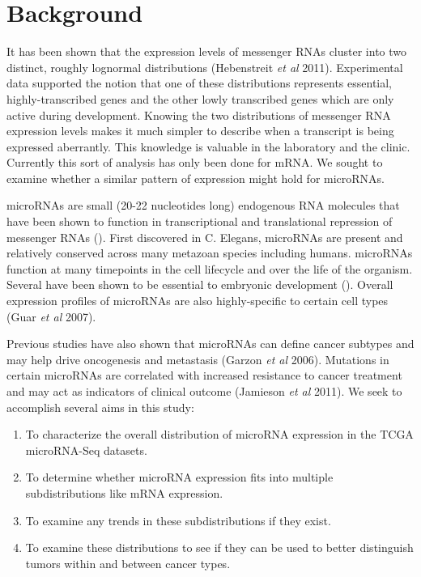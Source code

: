 \documentclass[12pt]{report}
\begin{document}
\section*{Background}
It has been shown that the expression levels of messenger RNAs cluster into two distinct, roughly lognormal distributions (Hebenstreit \textit{et al} 2011).
Experimental data supported the notion that one of these distributions
represents essential, highly-transcribed genes and the other lowly transcribed genes which are only active during development. Knowing the two distributions of messenger RNA
expression levels makes it much simpler to describe when a transcript is being expressed aberrantly.
This knowledge is valuable in the laboratory and the clinic.
Currently this sort of analysis has only been done for mRNA. We sought to examine whether a similar pattern of expression might hold for microRNAs.

microRNAs are small (20-22 nucleotides long) endogenous RNA molecules that have been shown to function in transcriptional and translational repression of messenger RNAs ().
First discovered in C. Elegans, microRNAs are present and relatively conserved across many metazoan species including humans. microRNAs function at many timepoints in the cell lifecycle
and over the life of the organism. Several have been shown to be essential to embryonic development (). Overall expression profiles of microRNAs are also highly-specific to certain cell types (Guar \textit{et al} 2007).


Previous studies have also shown that microRNAs can define cancer subtypes and may help drive oncogenesis and metastasis (Garzon \textit{et al} 2006). Mutations in certain microRNAs are correlated with increased
resistance to cancer treatment and may act as indicators of clinical outcome (Jamieson \textit{et al} 2011). We seek to accomplish several aims in this study:
\begin{enumerate}
 \item To characterize the overall distribution of microRNA expression in the TCGA microRNA-Seq datasets.
 \item To determine whether microRNA expression fits into multiple subdistributions like mRNA expression.
 \item To examine any trends in these subdistributions if they exist.
 \item To examine these distributions to see if they can be used to better distinguish tumors within and between cancer types.
\end{enumerate}
\end{document}
